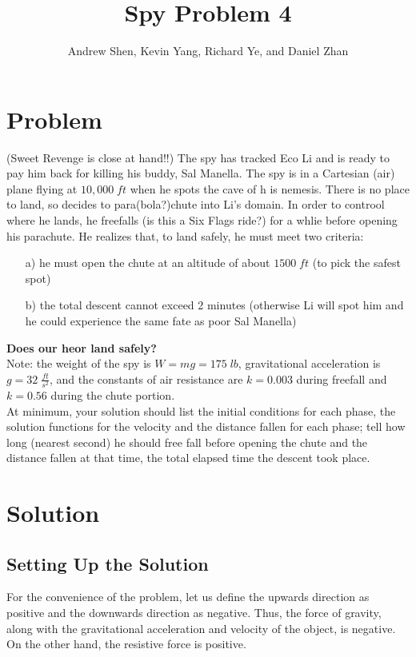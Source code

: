 \documentclass{article}
\title{Spy Problem 4}
\author{Andrew Shen, Kevin Yang, Richard Ye, and Daniel Zhan}
\begin{document}
	\maketitle
	\section{Problem}
	(Sweet Revenge is close at hand!!) The spy has tracked Eco Li and is ready to pay him back for killing his buddy, Sal Manella. The spy is in a Cartesian (air) plane flying at $10,000\;ft$ when he spots the cave of h is nemesis. There is no place to land, so decides to para(bola?)chute into Li's domain. In order to controol where he lands, he freefalls (is this a Six Flags ride?) for a whlie before opening his parachute. He realizes that, to land safely, he must meet two criteria:
	\begin{enumerate}
		\item[a)] he must open the chute at an altitude of about $1500\;ft$ (to pick the safest spot)
		\item[b)]the total descent cannot exceed 2 minutes (otherwise Li will spot him and he could experience the same fate as poor Sal Manella)
	\end{enumerate}
	\textbf{Does our heor land safely?}
	\\
	Note: the weight of the spy is $W = mg= 175\;lb$, gravitational acceleration is $g=32\;\frac{ft}{s^2}$, and the constants of air resistance are $k=0.003$ during freefall and $k=0.56$ during the chute portion.\\
	At minimum, your solution should list the initial conditions for each phase, the solution functions for the velocity and the distance fallen for each phase; tell how long (nearest second) he should free fall before opening the chute and the distance fallen at that time, the total elapsed time the descent took place.
	\section{Solution}
	\subsection{Setting Up the Solution}
	For the convenience of the problem, let us define the upwards direction as positive and the downwards direction as negative. Thus, the force of gravity, along with the gravitational acceleration and velocity of the object, is negative. On the other hand, the resistive force is positive.
\end{document}
